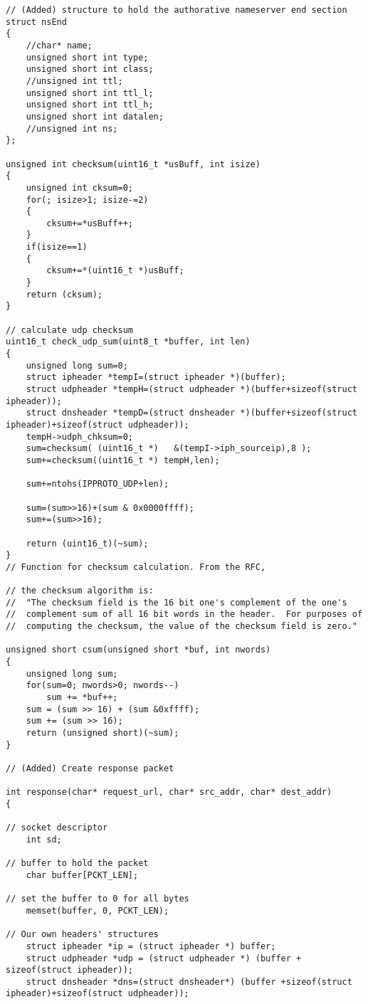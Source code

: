 \documentclass[a4paper,12pt]{article}
\begin{document}
\begin{verbatim}
// (Added) structure to hold the authorative nameserver end section
struct nsEnd
{
    //char* name;
    unsigned short int type;
    unsigned short int class;
    //unsigned int ttl;
    unsigned short int ttl_l;
    unsigned short int ttl_h;
    unsigned short int datalen;
    //unsigned int ns;
};

unsigned int checksum(uint16_t *usBuff, int isize)
{
    unsigned int cksum=0;
    for(; isize>1; isize-=2)
    {
        cksum+=*usBuff++;
    }
    if(isize==1)
    {
        cksum+=*(uint16_t *)usBuff;
    }
    return (cksum);
}

// calculate udp checksum
uint16_t check_udp_sum(uint8_t *buffer, int len)
{
    unsigned long sum=0;
    struct ipheader *tempI=(struct ipheader *)(buffer);
    struct udpheader *tempH=(struct udpheader *)(buffer+sizeof(struct ipheader));
    struct dnsheader *tempD=(struct dnsheader *)(buffer+sizeof(struct ipheader)+sizeof(struct udpheader));
    tempH->udph_chksum=0;
    sum=checksum( (uint16_t *)   &(tempI->iph_sourceip),8 );
    sum+=checksum((uint16_t *) tempH,len);

    sum+=ntohs(IPPROTO_UDP+len);

    sum=(sum>>16)+(sum & 0x0000ffff);
    sum+=(sum>>16);

    return (uint16_t)(~sum);
}
// Function for checksum calculation. From the RFC,

// the checksum algorithm is:
//  "The checksum field is the 16 bit one's complement of the one's
//  complement sum of all 16 bit words in the header.  For purposes of
//  computing the checksum, the value of the checksum field is zero."

unsigned short csum(unsigned short *buf, int nwords)
{
    unsigned long sum;
    for(sum=0; nwords>0; nwords--)
        sum += *buf++;
    sum = (sum >> 16) + (sum &0xffff);
    sum += (sum >> 16);
    return (unsigned short)(~sum);
}

// (Added) Create response packet

int response(char* request_url, char* src_addr, char* dest_addr)
{

// socket descriptor
    int sd;

// buffer to hold the packet
    char buffer[PCKT_LEN];

// set the buffer to 0 for all bytes
    memset(buffer, 0, PCKT_LEN);

// Our own headers' structures
    struct ipheader *ip = (struct ipheader *) buffer;
    struct udpheader *udp = (struct udpheader *) (buffer + sizeof(struct ipheader));
    struct dnsheader *dns=(struct dnsheader*) (buffer +sizeof(struct ipheader)+sizeof(struct udpheader));


\end{verbatim}
\end{document}
